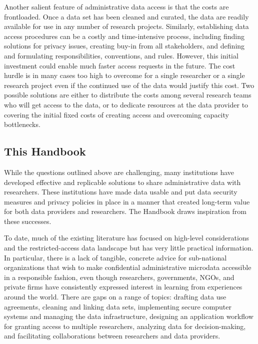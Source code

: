 \documentclass[
]{WileySix}
\begin{document}
Another salient feature of administrative data access is that the costs are frontloaded. Once a data set has been cleaned and curated, the data are readily available for use in any number of research projects. Similarly, establishing data access procedures can be a costly and time-intensive process, including finding solutions for privacy issues, creating buy-in from all stakeholders, and defining and formulating responsibilities, conventions, and rules. However, this initial investment could enable much faster access requests in the future. The cost hurdle is in many cases too high to overcome for a single researcher or a single research project even if the continued use of the data would justify this cost. Two possible solutions are either to distribute the costs among several research teams who will get access to the data, or to dedicate resources at the data provider to covering the initial fixed costs of creating access and overcoming capacity bottlenecks.

\hypertarget{this-handbook}{%
\subsection{This Handbook}\label{this-handbook}}

While the questions outlined above are challenging, many institutions have developed effective and replicable solutions to share administrative data with researchers. These institutions have made data usable and put data security measures and privacy policies in place in a manner that created long-term value for both data providers and researchers. The Handbook draws inspiration from these successes.

To date, much of the existing literature has focused on high-level considerations and the restricted-access data landscape \citep{harron2017} but has very little practical information. In particular, there is a lack of tangible, concrete advice for sub-national organizations that wish to make confidential administrative microdata accessible in a responsible fashion, even though researchers, governments, NGOs, and private firms have consistently expressed interest in learning from experiences around the world. There are gaps on a range of topics: drafting data use agreements, cleaning and linking data sets, implementing secure computer systems and managing the data infrastructure, designing an application workflow for granting access to multiple researchers, analyzing data for decision-making, and facilitating collaborations between researchers and data providers.
\end{document}
